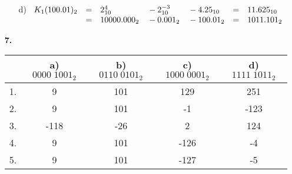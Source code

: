 \documentclass[a4paper,10pt]{scrartcl}
\begin{document}
\begin{enumerate}
\begin{enumerate}
            \item[d)]
                $\begin{array}[t]{rclllcl}
                    K_1(100.01)_2 &=& 2_{10}^4 &{}- 2_{10}^{-3} &{}- 4.25_{10} &=& 11.625_{10} \\
                    &=& 10000.000_2 &{}- 0.001_2 &{}- 100.01_2 &=& 1011.101_2
                \end{array}$
        \end{enumerate}

    \item[\textbf{7.}]
        \bgroup
        \def\arraystretch{1.5}
        \begin{tabular}[t]{|l|c|c|c|c|}
            \hline
            & a) $0000\;1001_2$ & b) $0110\;0101_2$ & c) $1000\;0001_2$ & d) $1111\;1011_2$\\
            \hline
            1. &  9  & 101 & 129 & 251 \\
            2. &  9  & 101 &  -1 &-123 \\
            3. &-118 & -26 &   2 & 124 \\
            4. &  9  & 101 &-126 &  -4 \\
            5. &  9  & 101 &-127 &  -5 \\
            \hline
        \end{tabular}
        \egroup

\end{enumerate}
\end{document}
